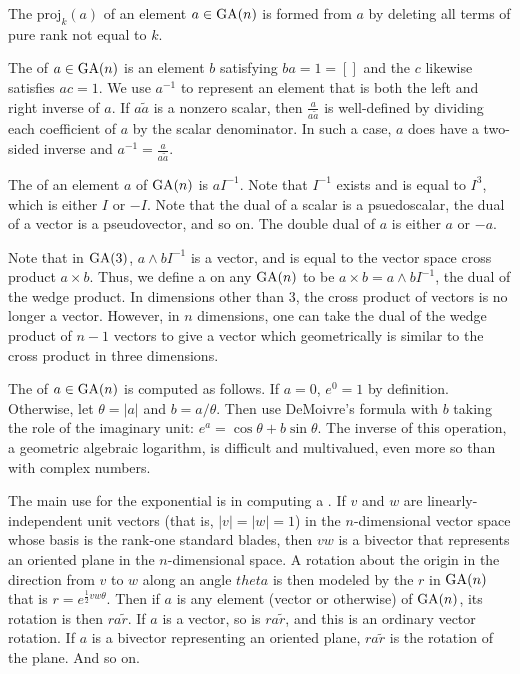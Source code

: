\documentclass{amsproc}
\theoremstyle{definition}
\theoremstyle{remark}
\numberwithin{equation}{section}
\begin{document}
The  $\mathrm{proj}_k(a)$ of an element $a\in \mathop{\mathrm{GA}}(n)$ is
formed from $a$ by deleting all terms of pure rank not equal to $k$.

The  of $a\in \mathop{\mathrm{GA}}(n)$ is an element $b$ satisfying
$ba=1=[]$ and the  $c$ likewise satisfies $ac=1$.
We use $a^{-1}$ to represent an element that is both the left and right
inverse of $a$.  If $a{\tilde{a}}$ is a nonzero scalar, then
$\frac{a}{a{\tilde{a}}}$ is well-defined by dividing each coefficient of
$a$ by the scalar denominator.  In such a case, $a$ does have a
two-sided inverse and $a^{-1} = \frac{a}{a{\tilde{a}}}$.

The  of an element $a$ of $\mathop{\mathrm{GA}}(n)$ is $aI^{-1}$.  Note that
$I^{-1}$ exists and is equal to $I^3$, which is either $I$ or $-I$.
Note that the dual of a scalar is a psuedoscalar, the dual of a vector
is a pseudovector, and so on.  The double dual of $a$ is either $a$ or
$-a$.

Note that in $\mathop{\mathrm{GA}}(3)$, $a\wedge{b}I^{-1}$ is a vector, and is equal to
the vector space cross product $a\times{b}$.  Thus, we define a
 on any $\mathop{\mathrm{GA}}(n)$ to be
$a\times{b}=a\wedge{b}I^{-1}$, the dual of the wedge product.  In
dimensions other than 3, the cross product of vectors is no longer a
vector.  However, in $n$ dimensions, one can take the dual of the
wedge product of $n-1$ vectors to give a vector which geometrically is
similar to the cross product in three dimensions.

The  of $a\in{\ensuremath{\mathop{\mathrm{GA}}}}(n)$ is computed as follows.  If
$a=0$, $e^0=1$ by definition.  Otherwise, let $\theta=|a|$ and
$b=a/\theta$.  Then use DeMoivre's formula with $b$ taking the role of
the imaginary unit: $e^a = \cos\theta + b\sin\theta$.  The inverse of
this operation, a geometric algebraic logarithm, is difficult and
multivalued, even more so than with complex numbers.

The main use for the exponential is in computing a .  If
$v$ and $w$ are linearly-independent unit vectors (that is,
$|v|=|w|=1$) in the $n$-dimensional vector space whose basis is the
rank-one standard blades, then $vw$ is a bivector that represents an
oriented plane in the $n$-dimensional space.  A rotation about the
origin in the direction from $v$ to $w$ along an angle $theta$ is then
modeled by the  $r$ in $\mathop{\mathrm{GA}}(n)$ that is $r =
e^{\frac12vw\theta}$.  Then if $a$ is any element (vector or
otherwise) of $\mathop{\mathrm{GA}}(n)$, its rotation is then $ra{\tilde{r}}$.  If $a$
is a vector, so is $ra{\tilde{r}}$, and this is an ordinary vector
rotation.  If $a$ is a bivector representing an oriented plane,
$ra{\tilde{r}}$ is the rotation of the plane.  And so on.
\end{document}
